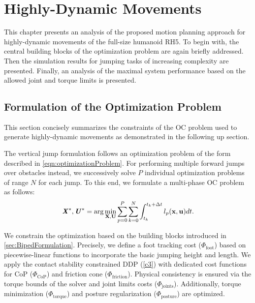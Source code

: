 
\chapter{Highly-Dynamic Movements}\label{c5}
This chapter presents an analysis of the proposed motion planning approach for highly-dynamic movements of the full-size humanoid RH5. To begin with, the central building blocks of the optimization problem are again briefly addressed. Then the simulation results for jumping tasks of increasing complexity are presented. Finally, an analysis of the maximal system performance based on the allowed joint and torque limits is presented.  


\section{Formulation of the Optimization Problem}\label{sec:HighlyFormulation}
This section concisely summarizes the constraints of the \gls{OC} problem used to generate highly-dynamic movements as demonstrated in the following up section. 

The vertical jump formulation follows an optimization problem of the form described in \cref{eqn:optimizationProblem}. For performing multiple forward jumps over obstacles instead, we successively solve $P$ individual optimization problems of range $N$ for each jump. To this end, we formulate a multi-phase \gls{OC} problem as follows: 
\begin{equation}\label{eqn:optimizationProblemSequence}
\bm{\mathit{X}}^*,\bm{\mathit{U}}^*= 
\arg\min_{\mathbf{X},\mathbf{U}} \sum_{p=0}^{P}
\sum_{k=0}^{N} \int_{t_k}^{t_k+\Delta t} l_p(\mathbf{x},\mathbf{u})dt. 
\end{equation} 

We constrain the optimization based on the building blocks introduced in \cref{sec:BipedFormulation}. Precisely, we define a foot tracking cost ($\Phi_{\text{foot}}$) based on piecewise-linear functions to incorporate the basic jumping height and length. We apply the contact stability constrained \gls{DDP} (\cref{c3}) with dedicated cost functions for \gls{CoP} ($\Phi_{\text{CoP}}$) and friction cone ($\Phi_{\text{friction}}$). Physical consistency is ensured via the torque bounds of the solver and joint limits costs ($\Phi_{\text{joints}}$). Additionally, torque minimization ($\Phi_{\text{torque}}$) and posture regularization ($\Phi_{\text{posture}}$) are optimized.

